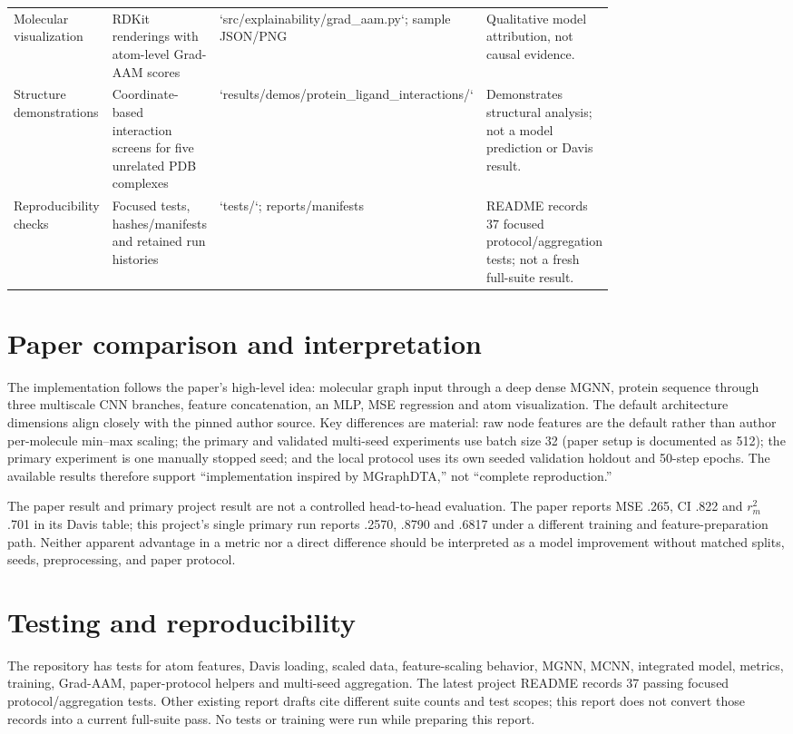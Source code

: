\begin{table}[tb]
\begin{tabularx}{\linewidth}{p{0.20\linewidth}p{0.37\linewidth}p{0.20\linewidth}X}
Molecular visualization & RDKit renderings with atom-level Grad-AAM scores & `src/explainability/grad_aam.py`; sample JSON/PNG & Qualitative model attribution, not causal evidence. \\
Structure demonstrations & Coordinate-based interaction screens for five unrelated PDB complexes & `results/demos/protein_ligand_interactions/` & Demonstrates structural analysis; not a model prediction or Davis result. \\
Reproducibility checks & Focused tests, hashes/manifests and retained run histories & `tests/`; reports/manifests & README records 37 focused protocol/aggregation tests; not a fresh full-suite result. \\
\bottomrule
\end{tabularx}
\end{table}

\section{Paper comparison and interpretation}
The implementation follows the paper’s high-level idea: molecular graph input through a deep dense MGNN, protein sequence through three multiscale CNN branches, feature concatenation, an MLP, MSE regression and atom visualization. The default architecture dimensions align closely with the pinned author source. Key differences are material: raw node features are the default rather than author per-molecule min--max scaling; the primary and validated multi-seed experiments use batch size 32 (paper setup is documented as 512); the primary experiment is one manually stopped seed; and the local protocol uses its own seeded validation holdout and 50-step epochs. The available results therefore support “implementation inspired by MGraphDTA,” not “complete reproduction.”

The paper result and primary project result are not a controlled head-to-head evaluation. The paper reports MSE .265, CI .822 and $r_m^2$ .701 in its Davis table; this project’s single primary run reports .2570, .8790 and .6817 under a different training and feature-preparation path. Neither apparent advantage in a metric nor a direct difference should be interpreted as a model improvement without matched splits, seeds, preprocessing, and paper protocol.

\section{Testing and reproducibility}
The repository has tests for atom features, Davis loading, scaled data, feature-scaling behavior, MGNN, MCNN, integrated model, metrics, training, Grad-AAM, paper-protocol helpers and multi-seed aggregation. The latest project README records 37 passing focused protocol/aggregation tests. Other existing report drafts cite different suite counts and test scopes; this report does not convert those records into a current full-suite pass. No tests or training were run while preparing this report.

